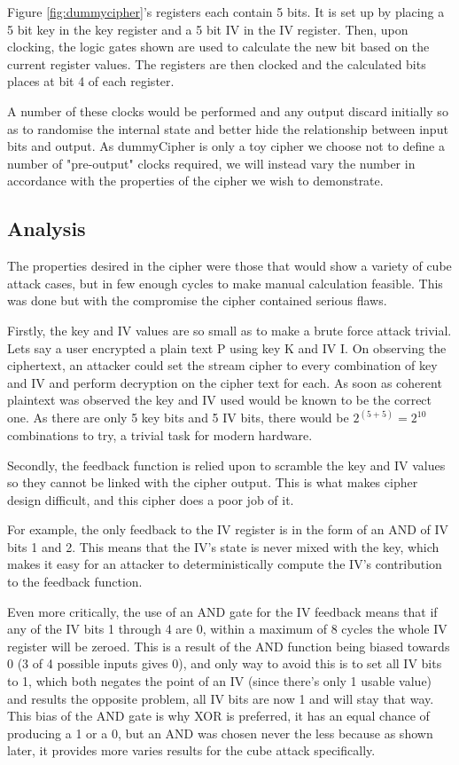 \documentclass{report}
\let\Oldsubsection\subsection
\renewcommand{\subsection}{\FloatBarrier\Oldsubsection}
\begin{document}
Figure \ref{fig:dummycipher}'s registers each contain 5 bits. It is set up by placing a 5 bit key in the key register and a 5 bit IV in the IV register. Then, upon clocking, the logic gates shown are used to calculate the new bit based on the current register values. The registers are then clocked and the calculated bits places at bit 4 of each register.

A number of these clocks would be performed and any output discard initially so as to randomise the internal state and better hide the relationship between input bits and output. As dummyCipher is only a toy cipher we choose not to define a number of "pre-output" clocks required, we will instead vary the number in accordance with the properties of the cipher we wish to demonstrate.

\subsection{Analysis}

The properties desired in the cipher were those that would show a variety of cube attack cases, but in few enough cycles to make manual calculation feasible. This was done but with the compromise the cipher contained serious flaws.

Firstly, the key and IV values are so small as to make a brute force attack trivial. Lets say a user encrypted a plain text P using key K and IV I. On observing the ciphertext, an attacker could set the stream cipher to every combination of key and IV and perform decryption on the cipher text for each. As soon as coherent plaintext was observed the key and IV used would be known to be the correct one. As there are only 5 key bits and 5 IV bits, there would be $2^(5+5) = 2^10$ combinations to try, a trivial task for modern hardware.

Secondly, the feedback function is relied upon to scramble the key and IV values so they cannot be linked with the cipher output. This is what makes cipher design difficult, and this cipher does a poor job of it.

For example, the only feedback to the IV register is in the form of an AND of IV bits 1 and 2. This means that the IV's state is never mixed with the key, which makes it easy for an attacker to deterministically compute the IV's contribution to the feedback function.

Even more critically, the use of an AND gate for the IV feedback means that if any  of the IV bits 1 through 4 are 0, within a maximum of 8 cycles the whole IV register will be zeroed. This is a result of the AND function being biased towards 0 (3 of 4 possible inputs gives 0), and only way to avoid this is to set all IV bits to 1, which both negates the point of an IV (since there's only 1 usable value) and results the opposite problem, all IV bits are now 1 and will stay that way. This bias of the AND gate is why XOR is preferred, it has an equal chance of producing a 1 or a 0, but an AND was chosen never the less because as shown later, it provides more varies results for the cube attack 
specifically.
\end{document}
